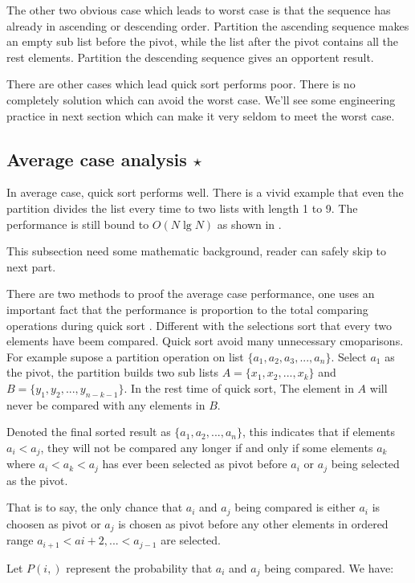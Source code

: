 \documentclass{article}
\begin{document}
The other two obvious case which leads to worst case is that the sequence has already in
ascending or descending order. Partition the ascending sequence makes an empty sub list 
before the pivot, while the list after the pivot contains all the rest elements.
Partition the descending sequence gives an opportent result.

There are other cases which lead quick sort performs poor. There is no completely solution
which can avoid the worst case. We'll see some engineering practice in next section which can 
make it very seldom to meet the worst case.

\subsection{Average case analysis $\star$}

In average case, quick sort performs well. There is a vivid example that even the partition
divides the list every time to two lists with length 1 to 9. The performance is still bound
to $O(N \lg N)$ as shown in \cite{CLRS}.

This subsection need some mathematic background, reader can safely skip to next part.

There are two methods to proof the average case performance, one uses an important fact
that the performance is proportion to the total comparing operations during quick sort \cite{CLRS}.
Different with the selections sort that every two elements have beem compared. Quick sort
avoid many unnecessary cmoparisons. For example supose a partition operation on list
$\{ a_1, a_2, a_3, ..., a_n\}$. Select $a_1$ as the pivot, the partition builds two sub lists
$A = \{x_1, x_2, ..., x_k\}$ and $B = \{ y_1, y_2, ..., y_{n-k-1} \}$.
In the rest time of quick sort, The element in $A$ will never be compared with any elements in $B$.

Denoted the final sorted result as $\{ a_1, a_2, ..., a_n \}$, 
this indicates that if elements $a_i < a_j$, they will not be compared
any longer if and only if some elements $a_k$ where $a_i < a_k < a_j$ has ever been selected as pivot
before $a_i$ or $a_j$ being selected as the pivot.

That is to say, the only chance that $a_i$ and $a_j$ being compared is either $a_i$ is choosen
as pivot or $a_j$ is chosen as pivot before any other elements in ordered range 
$a_{i+1} < a{i+2}, ... < a_{j-1}$ are selected.

Let $P(i, )$ represent the probability that $a_i$ and $a_j$ being compared. We have:
\end{document}
